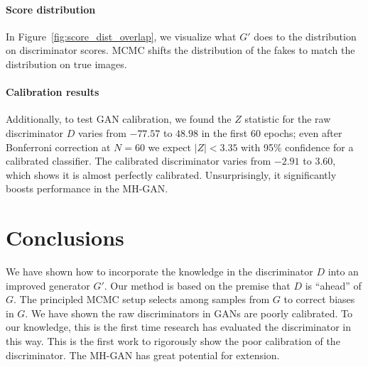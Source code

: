 \documentclass{article}
\begin{document}
\paragraph{Score distribution}
In Figure~\ref{fig:score_dist_overlap}, we visualize what $G'$ does to the distribution on discriminator scores.
MCMC shifts the distribution of the fakes to match the distribution on true images.

\paragraph{Calibration results}
Additionally, to test GAN calibration, we found the $Z$ statistic for the raw discriminator $D$ varies from $-77.57$ to $48.98$ in the first 60 epochs; even after Bonferroni correction at $N \!\!=\!\! 60$ we expect $|Z| < 3.35$ with 95\% confidence for a calibrated classifier.
The calibrated discriminator varies from $-2.91$ to $3.60$, which shows it is almost perfectly calibrated.
Unsurprisingly, it significantly boosts performance in the MH-GAN\@.


\section{Conclusions}
\label{sec:conclusions}

We have shown how to incorporate the knowledge in the discriminator $D$ into an improved generator $G'$.
Our method is based on the premise that $D$ is ``ahead'' of $G$.
The principled MCMC setup selects among samples from $G$ to correct biases in $G$.
We have shown the raw discriminators in GANs are poorly calibrated.
To our knowledge, this is the first time research has evaluated the discriminator in this way.
This is the first work to rigorously show the poor calibration of the discriminator.
The MH-GAN has great potential for extension.


\end{document}
